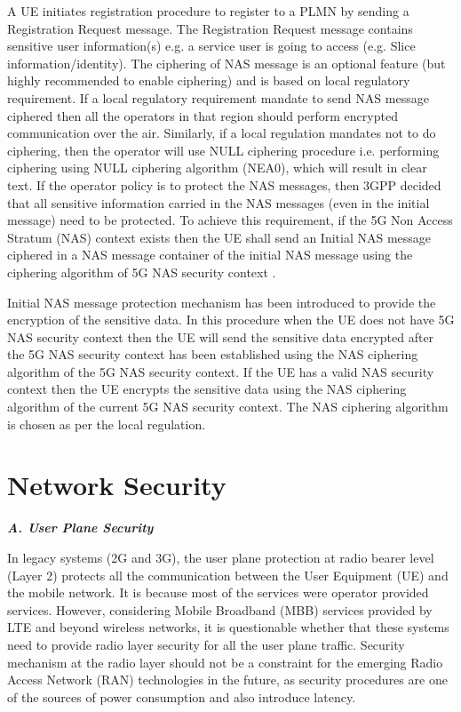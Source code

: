\begin{multicols}{2}
A UE initiates registration procedure to register to a PLMN by sending a Registration Request message. The Registration Request message contains sensitive user information(s) e.g. a service user is going to access (e.g. Slice information/identity). The ciphering of NAS message is an optional feature (but highly recommended to enable ciphering) and is based on local regulatory requirement. If a local regulatory requirement mandate to send NAS message ciphered then all the operators in that region should perform encrypted communication over the air. Similarly, if a local regulation mandates not to do ciphering, then the operator will use NULL ciphering procedure i.e. performing ciphering using NULL ciphering algorithm (NEA0), which will result in clear text. If the operator policy is to protect the NAS messages, then 3GPP decided that all sensitive information carried in the NAS messages (even in the initial message) need to be protected. To achieve this requirement, if the 5G Non Access Stratum (NAS) context exists then the UE shall send an Initial NAS message ciphered in a NAS message container of the initial NAS message using the ciphering algorithm of 5G NAS security context \cite{art4-key03}.

Initial NAS message protection mechanism has been introduced to provide the encryption of the sensitive data. In this procedure when the UE does not have 5G NAS security context then the UE will send the sensitive data encrypted after the 5G NAS security context has been established using the NAS ciphering algorithm of the 5G NAS security context. If the UE has a valid NAS security context then the UE encrypts the sensitive data using the NAS ciphering algorithm of the current 5G NAS security context. The NAS ciphering algorithm is chosen as per the local regulation.

\section{Network Security}

\noindent
{\bf {\textit{A. User Plane Security}}}

In legacy systems (2G and 3G), the user plane protection at radio bearer level (Layer 2) protects all the communication between the User Equipment (UE) and the mobile network. It is because most of the services were operator provided services. However, considering Mobile Broadband (MBB) services provided by LTE and beyond wireless networks, it is questionable whether that these systems need to provide radio layer security for all the user plane traffic. Security mechanism at the radio layer should not be a constraint for the emerging Radio Access Network (RAN) technologies in the future, as security procedures are one of the sources of power consumption and also introduce latency.


\end{multicols}
